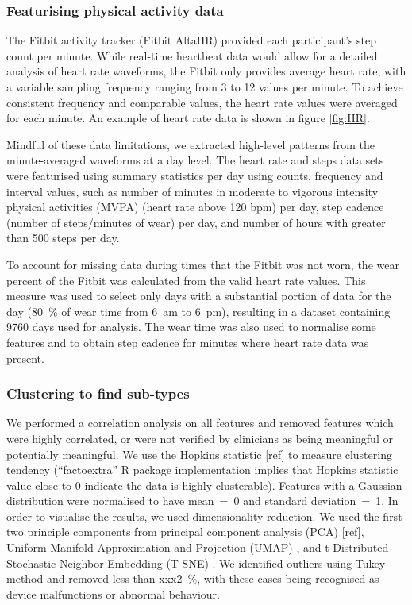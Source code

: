 \documentclass{article}
\begin{document}
\subsubsection{Featurising physical activity data}
The Fitbit activity tracker (Fitbit AltaHR) provided each participant’s step count per minute. While real-time heartbeat data would allow for a detailed analysis of heart rate waveforms, the Fitbit only provides average heart rate, with a variable sampling frequency ranging from 3 to 12 values per minute. To achieve consistent frequency and comparable values, the heart rate values were averaged for each minute. An example of heart rate data is shown in figure \ref{fig:HR}.


Mindful of these data limitations, we extracted high-level patterns from the minute-averaged waveforms at a day level. The heart rate and steps data sets were featurised using summary statistics per day using counts, frequency and interval values, such as number of minutes in moderate to vigorous intensity physical activities (MVPA) (heart rate above 120 bpm) per day, step cadence (number of steps/minutes of wear) per day, and number of hours with greater than 500 steps per day. 

To account for missing data during times that the Fitbit was not worn, the wear percent of the Fitbit was calculated from the valid heart rate values. This measure was used to select only days with a substantial portion of data for the day (80~\% of wear time from 6~am to 6~pm), resulting in a dataset containing 9760 days used for analysis. The wear time was also used to normalise some features and to obtain step cadence for minutes where heart rate data was present. 

\subsubsection{Clustering to find sub-types}  

We performed a correlation analysis on all features and removed features which were highly correlated, or were not verified by clinicians as being meaningful or potentially meaningful. We use the Hopkins statistic [ref] to measure clustering tendency (“factoextra” R package implementation implies that Hopkins statistic value close to 0 indicate the data is highly clusterable). Features with a Gaussian distribution were normalised to have mean~=~0 and standard deviation~=~1. In order to visualise the results, we used dimensionality reduction. We used the first two principle components from principal component analysis (PCA) [ref], Uniform Manifold Approximation and Projection (UMAP) \cite{Mcinnes2018}, and t-Distributed Stochastic Neighbor Embedding (T-SNE) \cite{Maaten2008}. We identified outliers using Tukey method and removed less than xxx2~\%, with these cases being recognised as device malfunctions or abnormal behaviour.  
\end{document}
